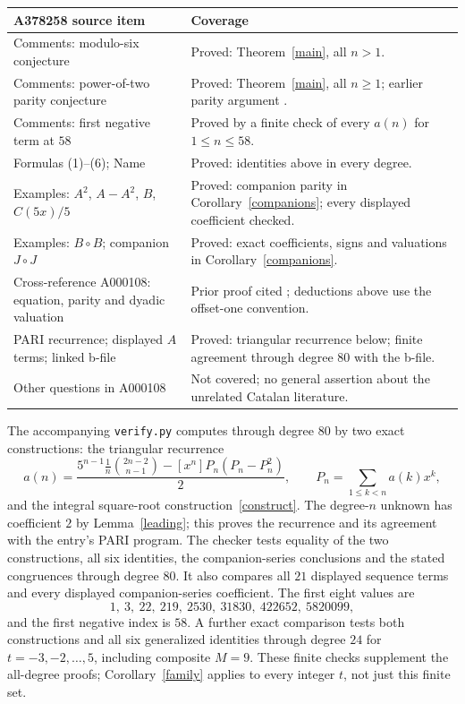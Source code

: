 \documentclass[11pt]{article}
\begin{document}
\begin{center}
\small
\begin{tabular}{p{.48\linewidth}p{.42\linewidth}}
\toprule
A378258 source item & Coverage\\
\midrule
Comments: modulo-six conjecture & Proved: Theorem~\ref{main}, all $n>1$.\\
Comments: power-of-two parity conjecture & Proved: Theorem~\ref{main}, all $n\geq1$; earlier parity argument \cite[item 5]{earlier-parity}.\\
Comments: first negative term at $58$ & Proved by a finite check of every $a(n)$ for $1\leq n\leq58$.\\
Formulas (1)--(6); Name & Proved: identities above in every degree.\\
Examples: $A^2$, $A-A^2$, $B$, $C(5x)/5$ & Proved: companion parity in Corollary~\ref{companions}; every displayed coefficient checked.\\
Examples: $B\circ B$; companion $J\circ J$ & Proved: exact coefficients, signs and valuations in Corollary~\ref{companions}.\\
Cross-reference A000108: equation, parity and dyadic valuation & Prior proof cited \cite[Theorem 2.1]{deutsch-sagan}; deductions above use the offset-one convention.\\
PARI recurrence; displayed $A$ terms; linked b-file & Proved: triangular recurrence below; finite agreement through degree $80$ with the b-file.\\
Other questions in A000108 & Not covered; no general assertion about the unrelated Catalan literature.\\
\bottomrule
\end{tabular}
\end{center}

The accompanying \texttt{verify.py} computes through degree $80$ by two exact constructions: the triangular recurrence
\[
 a(n)=\frac{5^{n-1}\frac1n\binom{2n-2}{n-1}
 -[x^n]P_n(P_n-P_n^2)}2,\qquad
 P_n=\sum_{1\leq k<n}a(k)x^k,
\]
and the integral square-root construction~\eqref{construct}. The degree-$n$
unknown has coefficient $2$ by Lemma~\ref{leading}; this proves the recurrence
and its agreement with the entry's PARI program.
The checker tests equality of the two constructions, all six identities, the
companion-series conclusions and the stated congruences through degree $80$.
It also compares all $21$ displayed sequence terms and every displayed
companion-series coefficient. The first eight values are
\[
 1,\ 3,\ 22,\ 219,\ 2530,\ 31830,\ 422652,\ 5820099,
\]
and the first negative index is $58$. A further exact comparison tests both
constructions and all six generalized identities through degree $24$ for
$t=-3,-2,\ldots,5$, including composite $M=9$.
These finite checks supplement the all-degree proofs; Corollary~\ref{family}
applies to every integer $t$, not just this finite set.
\end{document}
